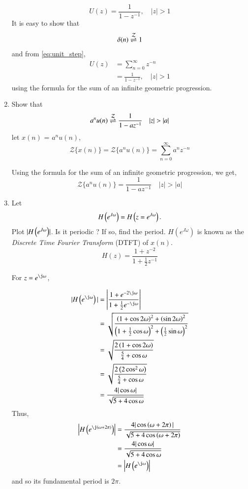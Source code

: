 \documentclass[journal,12pt,twocolumn]{IEEEtran}
\renewcommand\thesection{\arabic{section}}
\begin{document}
\begin{enumerate}[label=\thesection.\arabic*]
\begin{equation}
	U(z) = \frac{1}{1-z^{-1}},\quad |z| > 1
\end{equation}
\solution It is easy to show that
\begin{equation}
	\delta(n) \overset{\mathcal{Z}}{ \rightleftharpoons} 1
\end{equation}
and from \eqref{eq:unit_step},
\begin{align}
	U(z) &= \sum _{n= 0}^{\infty}z^{-n}
	\\
	&=\frac{1}{1-z^{-1}}, \quad |z| > 1
\end{align}
using the formula for the sum of an infinite geometric progression.
%
\item Show that 
\begin{equation}
	\label{eq:anun}
	a^nu(n) \overset{\mathcal{Z}}{ \rightleftharpoons} \frac{1}{1-az^{-1}} \quad |z| > |a|
\end{equation}
%
\solution let $x(n)$ = $a^{n}u(n)$,
\begin{equation}
	{\mathcal{Z}}\{x(n)\} = {\mathcal{Z}}\{a^{n}u(n)\} = \sum _{n= 0}^{\infty}a^{n}z^{-n}
\end{equation}

Using the formula for the sum of an infinite geometric progression, we get,
\begin{equation}
	{\mathcal{Z}}\{a^{n}u(n)\} = \frac{1}{1-az^{-1}} \quad |z| > |a|
\end{equation}
\item 
Let
\begin{equation}
	H\left(e^{J \omega}\right) = H\left(z = e^{J \omega}\right).
\end{equation}
Plot $|{H\left(e^{J \omega}\right)}|$.  Is it periodic ? If so, find the period. $H(e^{J \omega})$ is
known as the {\em Discrete Time Fourier Transform} (DTFT) of $x(n)$.
\\
\solution
\begin{equation}
	H(z) = \frac{1 + z^{-2}}{1 + \frac{1}{2}z^{-1}}
\end{equation}

For $z = e^{\j\omega}$,

\begin{align}
	|H\brak{e^{\j\omega}}| &= \left| \frac{1 + e^{-2\j\omega}}{1 + \frac{1}{2}e^{-\j\omega}} \right| \\
	&= \sqrt{\frac{\brak{1 + \cos{2\omega}}^2 + \brak{\sin{2\omega}}^2}{\brak{1 + \frac{1}{2}\cos{\omega}}^2 + \brak{\frac{1}{2}\sin{\omega}}^2}}\\
	&= \sqrt{\frac{2\brak{1 + \cos{2\omega}}}{\frac{5}{4} + \cos{\omega}}} \\
	&= \sqrt{\frac{2\brak{2\cos^2{\omega}}}{\frac{5}{4} + \cos{\omega}}} \\
	&= \frac{4|\cos{\omega}|}{\sqrt{5 + 4\cos{\omega}}}
\end{align}
Thus,
\begin{align}
	\left|H\brak{e^{\j\brak{\omega + 2\pi}}}\right| &= \frac{4|\cos\brak{\omega + 2\pi}|}{\sqrt{5 + 4\cos\brak{\omega + 2\pi}}} \\
	&= \frac{4|\cos{\omega}|}{\sqrt{5 + 4\cos{\omega}}} \\
	&= \left|H\brak{e^{\j\omega}}\right|	
\end{align}
and so its fundamental period is $2\pi$.


\end{enumerate}
\end{document}
